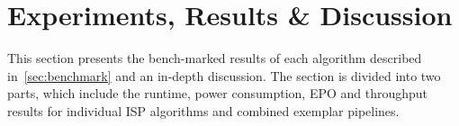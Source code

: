 








\section{Experiments, Results \& Discussion}\label{sec:result}
This section presents the bench-marked results of each algorithm described in~\ref{sec:benchmark} and an in-depth discussion. The section is divided into two parts, which include the runtime, power consumption, EPO and throughput results for individual ISP algorithms and combined exemplar pipelines.


